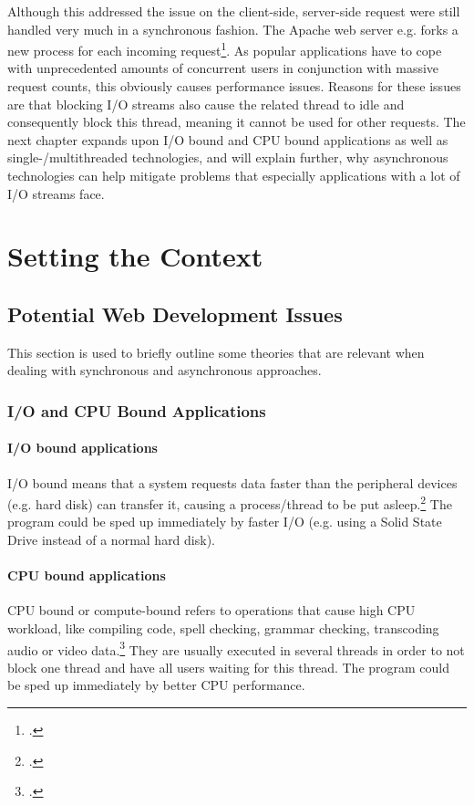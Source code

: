 Although this addressed the issue on the client-side, server-side request were
still handled very much in a synchronous fashion. The Apache web server e.g.
forks a new process for each incoming request\footcite[Cf.][]{apache_2013}.
As popular applications have to cope with unprecedented amounts of concurrent
users in conjunction with massive request counts, this obviously causes
performance issues. Reasons for these issues are that blocking I/O streams also
cause the related thread to idle and consequently block this thread, meaning it
cannot be used for other requests. The next chapter expands upon I/O bound and
CPU bound applications as well as single-/multithreaded technologies, and will
explain further, why asynchronous technologies can help mitigate problems that
especially applications with a lot of I/O streams face.\\

\newpage
\section{Setting the Context}
\label{setting_the_context}

\subsection{Potential Web Development Issues}
\label{potentialissues}
This section is used to briefly outline some theories that are relevant when dealing with synchronous and asynchronous approaches.

\subsubsection{I/O and CPU Bound Applications}

\paragraph{I/O bound applications}
\label{issue_io}
I/O bound means that a system requests data faster than the peripheral devices
(e.g. hard disk) can transfer it, causing a process/thread to be put
asleep.\footcite[Cf.][10]{Caldera_2003} The program could be sped up immediately
by faster I/O (e.g. using a Solid State Drive instead of a normal hard disk).

\paragraph{CPU bound applications}
\label{issue_cpu}
CPU bound or compute-bound refers to operations that cause high CPU workload,
like compiling code, spell checking, grammar checking, transcoding audio or
video data.\footcite[Cf.][718]{Richter_2010} They are usually executed in
several threads in order to not block one thread and have all users waiting for
this thread. The program could be sped up immediately by better CPU performance.

